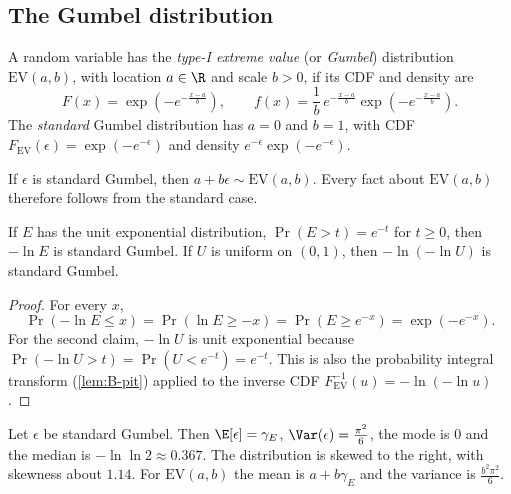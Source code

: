 \subsection{The Gumbel distribution}\label{sec:B-gumbel}

\begin{definition}\label{def:B-gumbel}
A random variable has the \emph{type-I extreme value} (or \emph{Gumbel}) distribution $\mathrm{EV}(a, b)$,
with location $a \in \R$ and scale $b > 0$, if its CDF and density are
\begin{equation}\label{eq:B-gumbel}
F(x) = \exp\left(-e^{-\frac{x - a}{b}}\right), \qquad
f(x) = \frac{1}{b}\,e^{-\frac{x - a}{b}}\exp\left(-e^{-\frac{x - a}{b}}\right).
\end{equation}
The \emph{standard} Gumbel distribution has $a = 0$ and $b = 1$, with CDF
$F_{\mathrm{EV}}(\epsilon) = \exp(-e^{-\epsilon})$ and density $e^{-\epsilon}\exp(-e^{-\epsilon})$.
\end{definition}

If $\epsilon$ is standard Gumbel, then $a + b\epsilon \sim \mathrm{EV}(a, b)$. Every fact about $\mathrm{EV}(a, b)$
therefore follows from the standard case.

\begin{lemma}\label{lem:B-gumbel-exp}
If $E$ has the unit exponential distribution, $\Pr(E > t) = e^{-t}$ for $t \geq 0$, then $-\ln E$ is standard
Gumbel. If $U$ is uniform on $(0, 1)$, then $-\ln(-\ln U)$ is standard Gumbel.
\end{lemma}

\begin{proof}
For every $x$,
\begin{equation*}
\Pr(-\ln E \leq x) = \Pr(\ln E \geq -x) = \Pr(E \geq e^{-x}) = \exp(-e^{-x}).
\end{equation*}
For the second claim, $-\ln U$ is unit exponential because $\Pr(-\ln U > t) = \Pr(U < e^{-t}) = e^{-t}$. This
is also the probability integral transform (\cref{lem:B-pit}) applied to the inverse CDF
$F_{\mathrm{EV}}^{-1}(u) = -\ln(-\ln u)$.
\end{proof}

\begin{proposition}\label{prop:B-gumbel-moments}
Let $\epsilon$ be standard Gumbel. Then $\E[\epsilon] = \gamma_E$, $\Var(\epsilon) = \frac{\pi^2}{6}$, the mode is $0$ and
the median is $-\ln\ln 2 \approx 0.367$. The distribution is skewed to the right, with skewness about
$1.14$. For $\mathrm{EV}(a, b)$ the mean is $a + b\gamma_E$ and the variance is $\frac{b^2\pi^2}{6}$.
\end{proposition}

